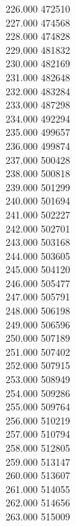 { 226.000	472510 \\
 227.000	474568 \\
 228.000	474828 \\
 229.000	481832 \\
 230.000	482169 \\
 231.000	482648 \\
 232.000	483284 \\
 233.000	487298 \\
 234.000	492294 \\
 235.000	499657 \\
 236.000	499874 \\
 237.000	500428 \\
 238.000	500818 \\
 239.000	501299 \\
 240.000	501694 \\
 241.000	502227 \\
 242.000	502701 \\
 243.000	503168 \\
 244.000	503605 \\
 245.000	504120 \\
 246.000	505477 \\
 247.000	505791 \\
 248.000	506198 \\
 249.000	506596 \\
 250.000	507189 \\
 251.000	507402 \\
 252.000	507915 \\
 253.000	508949 \\
 254.000	509286 \\
 255.000	509764 \\
 256.000	510219 \\
 257.000	510794 \\
 258.000	512805 \\
 259.000	513147 \\
 260.000	513607 \\
 261.000	514055 \\
 262.000	514656 \\
 263.000	515009 \\
}
